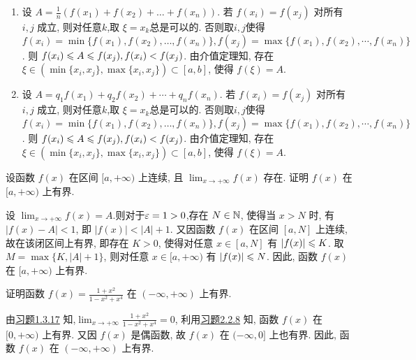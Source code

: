 \begin{solution}
    \begin{enumerate}
        \item 设 $A = \frac{1}{n}(f(x_1)+f(x_2)+\dots+f(x_n))$. 
              若 $f(x_i) = f(x_j)$ 对所有 $i,j$ 成立, 则对任意$k$,取 $\xi = x_k$总是可以的. 否则取$i,j$使得 $f(x_i) = \min\{f(x_1), f(x_2), \dots, f(x_n)\}, f(x_j) = \max\{f(x_1), f(x_2), \cdots, f(x_n)\}$. 则 $f(x_i) \leqslant A \leqslant f(x_j),f(x_i) < f(x_j)$. 由介值定理知, 存在 $\xi \in (\min\{x_i, x_j\},\max\{x_i, x_j\})\subset [a,b]$, 使得 $f(\xi) = A$.
        \item 设 $A = q_1f(x_1)+q_2f(x_2)+\cdots+q_nf(x_n)$. 
              若 $f(x_i) = f(x_j)$ 对所有 $i,j$ 成立, 则对任意$k$,取 $\xi = x_k$总是可以的. 否则取$i,j$使得 $f(x_i) = \min\{f(x_1), f(x_2), \dots, f(x_n)\}, f(x_j) = \max\{f(x_1), f(x_2), \cdots, f(x_n)\}$. 则 $f(x_i) \leqslant A \leqslant f(x_j),f(x_i) < f(x_j)$. 由介值定理知, 存在 $\xi \in (\min\{x_i, x_j\},\max\{x_i, x_j\})\subset [a,b]$, 使得 $f(\xi) = A$.
    \end{enumerate}
\end{solution}

\begin{exercise}[2.2.8]\label{exe:2.2.8}
    设函数 $f(x)$ 在区间 $[a, +\infty)$ 上连续, 且 $\lim_{x \to +\infty} f(x)$ 存在. 证明 $f(x)$ 在 $[a, +\infty)$ 上有界.
\end{exercise}

\begin{solution}
    设 $\lim_{x \to +\infty} f(x) = A$.则对于$\varepsilon=1>0$,存在 $N \in \mathbb{N}$, 使得当 $x > N$ 时, 有 $|f(x) - A| < 1$, 即 $|f(x)| < |A| + 1$.
    又因函数 $f(x)$ 在区间 $[a,N]$ 上连续, 故在该闭区间上有界, 即存在 $K > 0$, 使得对任意 $x \in [a,N]$ 有 $|f(x)| \leqslant K$. 
    取 $M = \max\{K, |A| + 1\}$, 则对任意 $x \in [a, +\infty)$ 有 $|f(x)| \leqslant N$. 因此, 函数 $f(x)$ 在 $[a, +\infty)$ 上有界.
\end{solution}

\begin{exercise}[2.2.9]
    证明函数 $f(x) = \frac{1+x^2}{1-x^2+x^4}$ 在 $(-\infty, +\infty)$ 上有界.
\end{exercise}

\begin{solution}
    由\hyperref[{exe:1.3.17}]{习题1.3.17} 知,$\lim_{x \to +\infty} \frac{1+x^2}{1-x^2+x^4} = 0$, 利用\hyperref[exe:2.2.8]{习题2.2.8} 知, 函数 $f(x)$ 在 $[0, +\infty)$ 上有界. 又因 $f(x)$ 是偶函数, 故 $f(x)$ 在 $(-\infty, 0]$ 上也有界. 因此, 函数 $f(x)$ 在 $(-\infty, +\infty)$ 上有界.
\end{solution}

